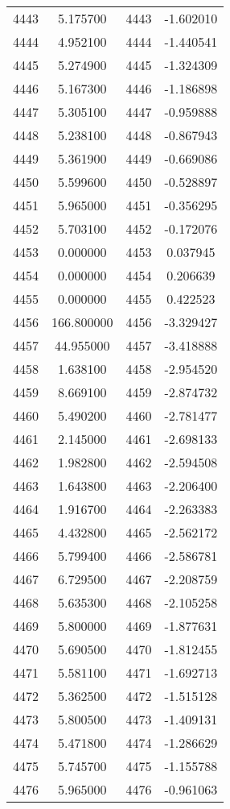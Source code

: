 \documentclass[12pt]{article}
\begin{document}
\begin{longtable}{@{}cccc@{}}
4443 & 5.175700 & 4443 & -1.602010 \\
4444 & 4.952100 & 4444 & -1.440541 \\
4445 & 5.274900 & 4445 & -1.324309 \\
4446 & 5.167300 & 4446 & -1.186898 \\
4447 & 5.305100 & 4447 & -0.959888 \\
4448 & 5.238100 & 4448 & -0.867943 \\
4449 & 5.361900 & 4449 & -0.669086 \\
4450 & 5.599600 & 4450 & -0.528897 \\
4451 & 5.965000 & 4451 & -0.356295 \\
4452 & 5.703100 & 4452 & -0.172076 \\
4453 & 0.000000 & 4453 & 0.037945 \\
4454 & 0.000000 & 4454 & 0.206639 \\
4455 & 0.000000 & 4455 & 0.422523 \\
4456 & 166.800000 & 4456 & -3.329427 \\
4457 & 44.955000 & 4457 & -3.418888 \\
4458 & 1.638100 & 4458 & -2.954520 \\
4459 & 8.669100 & 4459 & -2.874732 \\
4460 & 5.490200 & 4460 & -2.781477 \\
4461 & 2.145000 & 4461 & -2.698133 \\
4462 & 1.982800 & 4462 & -2.594508 \\
4463 & 1.643800 & 4463 & -2.206400 \\
4464 & 1.916700 & 4464 & -2.263383 \\
4465 & 4.432800 & 4465 & -2.562172 \\
4466 & 5.799400 & 4466 & -2.586781 \\
4467 & 6.729500 & 4467 & -2.208759 \\
4468 & 5.635300 & 4468 & -2.105258 \\
4469 & 5.800000 & 4469 & -1.877631 \\
4470 & 5.690500 & 4470 & -1.812455 \\
4471 & 5.581100 & 4471 & -1.692713 \\
4472 & 5.362500 & 4472 & -1.515128 \\
4473 & 5.800500 & 4473 & -1.409131 \\
4474 & 5.471800 & 4474 & -1.286629 \\
4475 & 5.745700 & 4475 & -1.155788 \\
4476 & 5.965000 & 4476 & -0.961063 \\

\end{longtable}
\end{document}
